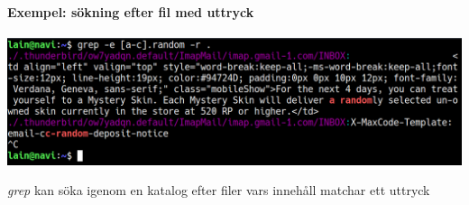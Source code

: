 \paragraph{Exempel: sökning efter fil med uttryck}
\begin{center}
        \includegraphics[width=\linewidth]{bilder/grep_sok_filer.png}
\end{center}
\emph{grep} kan söka igenom en katalog efter filer vars innehåll matchar ett uttryck

